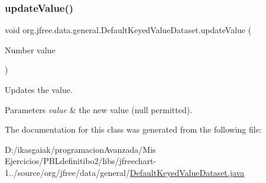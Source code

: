 \subsubsection{\texorpdfstring{update\+Value()}{updateValue()}}
{\footnotesize\ttfamily void org.\+jfree.\+data.\+general.\+Default\+Keyed\+Value\+Dataset.\+update\+Value (\begin{DoxyParamCaption}\item[{Number}]{value }\end{DoxyParamCaption})}

Updates the value.


\begin{DoxyParams}{Parameters}
{\em value} & the new value ({\ttfamily null} permitted). \\
\hline
\end{DoxyParams}


The documentation for this class was generated from the following file\+:\begin{DoxyCompactItemize}
\item 
D\+:/ikasgaiak/programacion\+Avanzada/\+Mis Ejercicios/\+P\+B\+Ldefinitibo2/libs/jfreechart-\/1../source/org/jfree/data/general/\mbox{\hyperlink{_default_keyed_value_dataset_8java}{Default\+Keyed\+Value\+Dataset.\+java}}\end{DoxyCompactItemize}
